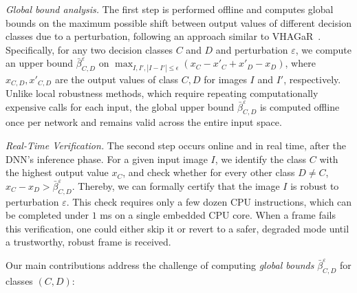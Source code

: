 \textit{Global bound analysis.} The first step is performed offline and computes global bounds on the maximum possible shift between output values of different decision classes due to a perturbation, following an approach similar to VHAGaR~\citep{vhagar}. 
%
Specifically, for any two decision classes $C$ and $D$ and perturbation $\varepsilon$, we compute an upper bound 
$\bar{\beta}^\varepsilon_{C,D}$ on 
$\max_{I,I', |I-I'| \leq \epsilon}(x_C - x'_C + x'_D - x_D)$, 
where $x_{C,D},x'_{C,D}$ are the output values of class $C,D$ for images $I$ and $I'$, respectively.  
%
Unlike local robustness methods, which require repeating computationally expensive calls for each input, the global upper bound $\bar{\beta}^\varepsilon_{C,D}$ is computed offline once per network and remains valid across the entire input space. 

\textit{Real-Time Verification.} The second step occurs online and in real time, after the DNN's inference phase. For a given input image $I$, we identify the class $C$ with the highest output value $x_C$, and check whether for every other class $D \neq C$, 
$x_C - x_D > \bar{\beta}^\varepsilon_{C,D}$. 
Thereby, we can formally certify that the image $I$ is robust to perturbation $\varepsilon$.
%
This check requires only a few dozen CPU instructions, which can be completed under $1$ ms on a single embedded CPU core. When a frame fails this verification, one could either skip it or revert to a safer, degraded mode until a trustworthy, robust frame is received.

Our main contributions address the challenge of computing {\em global bounds} $\bar{\beta}^\varepsilon_{C,D}$ for classes $(C,D)$:

